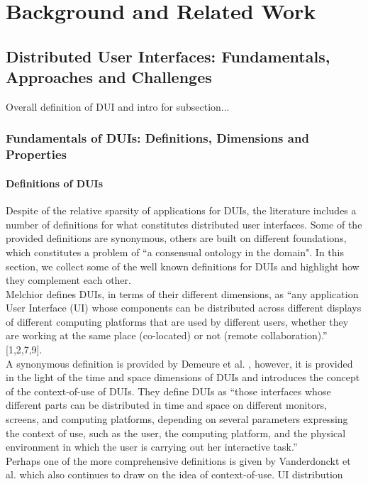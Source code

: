 \chapter{Background and Related Work}\label{chapter:litreview}
\section{Distributed User Interfaces: Fundamentals, Approaches and Challenges}
Overall definition of DUI and intro for subsection...
\subsection{Fundamentals of DUIs: Definitions, Dimensions and Properties}
\subsubsection{Definitions of DUIs}
Despite of the relative sparsity of applications for DUIs, the literature
includes a number of definitions for what constitutes distributed user interfaces. Some of the provided definitions are synonymous, others are
built on different foundations, which constitutes a problem of ``a consensual
ontology in the domain"\cite{vanderdonckt2010distributed}. In this section, we
collect some of the well known definitions for DUIs and highlight how they
complement each other.\\
Melchior \cite{melchior2011distributed} defines DUIs, in terms of their
different dimensions, as ``any application User Interface (UI) whose components
can be distributed across different displays of different computing platforms that are used by different users, whether they are working at the same place (co-located) or not (remote collaboration).'' [1,2,7,9].\\
A synonymous definition is provided by Demeure et al. \cite{demeure20084c},
however, it is provided in the light of the time and space dimensions of DUIs
and introduces the concept of the context-of-use of DUIs.
They define DUIs as ``those interfaces whose different parts can be distributed in time and space on different monitors, screens, and computing platforms, depending on several parameters expressing the context of use, such as the user, the computing platform, and the physical environment in which the user is carrying out her interactive task.'' \\ 
Perhaps one of the more comprehensive definitions is given by Vanderdonckt et
al. \cite{vanderdonckt2010distributed} which also continues to draw on the idea of context-of-use. UI distribution
